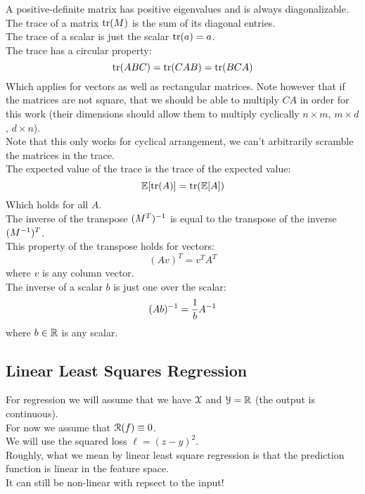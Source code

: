 \documentclass[12pt]{article}
\begin{document}
A positive-definite matrix has positive
eigenvalues and is always diagonalizable. \\

The trace of a matrix $\text{tr}(M)$ is the sum of its
diagonal entries. \\

The trace of a scalar is just the scalar
$\text{tr}(a) = a$. \\

The trace has a circular property:
\[ \text{tr}(ABC) = \text{tr}(CAB) = \text{tr}(BCA) \]
Which applies for vectors as well as 
rectangular matrices.
Note however that if the matrices are not
square, that we should be able to multiply $CA$
in order for this work
(their dimensions should allow them to 
multiply cyclically $n \times m$, $m \times d$,
$d \times n$). \\
Note that this only works for cyclical
arrangement, we can't arbitrarily
scramble the matrices in the trace. \\

The expected value of the trace
is the trace of the expected value:
\[ \mathbb{E}[\text{tr}(A)] = \text{tr}(\mathbb{E}[A]) \]
Which holds for all $A$. \\

The inverse of the transpose $(M^T)^{-1}$
is equal to the transpose of the inverse 
$(M^{-1})^T$. \\

This property of the transpose holds for vectors:
\[ (Av)^T = v^TA^T \]
where $v$ is any column vector. \\

The inverse of a scalar $b$ 
is just one over the scalar:
\[ (Ab)^{-1} = \dfrac{1}{b}A^{-1} \]
where $b \in \mathbb{R}$ is any scalar. \\

\newpage

\subsection*{Linear Least Squares Regression}

For regression we will assume that
we have $\mathcal{X}$ and $\mathcal{Y} = \mathbb{R}$
(the output is continuous). \\

For now we assume that $\mathcal{R}(f) \equiv 0$. \\

We will use the squared loss $\ell = (z- y)^2$. \\

Roughly, what we mean by linear least square 
regression is that
the prediction function is linear in the feature space. \\
It can still be non-linear with repsect to
the input! \\
\end{document}
